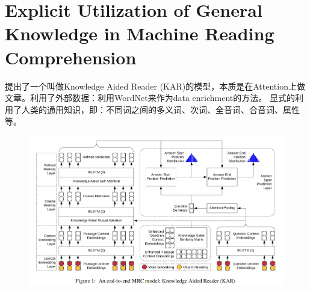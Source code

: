 \documentclass[a4paper,UTF8]{article}
\numberwithin{equation}{section}
\begin{document}
\newpage
\section{Explicit Utilization of General Knowledge in Machine Reading Comprehension}
提出了一个叫做Knowledge Aided Reader (KAR)的模型，本质是在Attention上做文章。利用了外部数据：利用WordNet来作为data enrichment的方法。
显式的利用了人类的通用知识，即：不同词之间的多义词、次词、全音词、合音词、属性等。
\begin{figure}[H]
	\centering
	\includegraphics[width=\textwidth]{8-1.png}
\end{figure}
\end{document}
